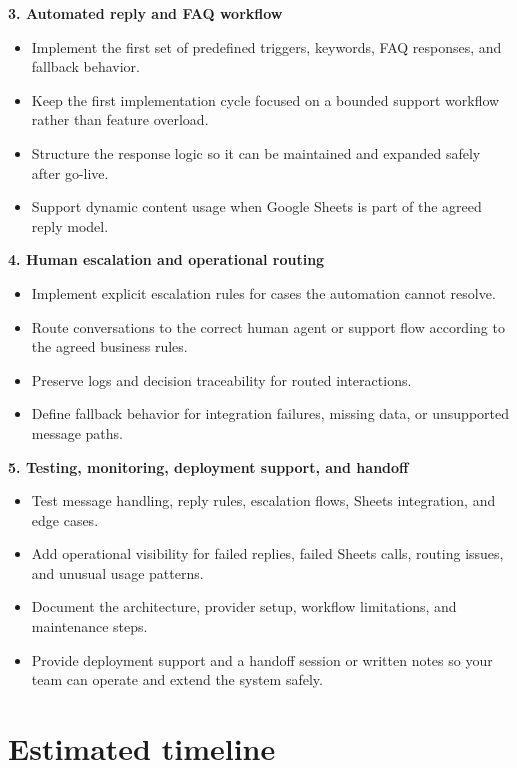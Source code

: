 \documentclass[11pt,a4paper]{article}
\begin{document}
\textbf{3. Automated reply and FAQ workflow}\par

\begin{itemize}
\item Implement the first set of predefined triggers, keywords, FAQ responses, and fallback behavior.
\item Keep the first implementation cycle focused on a bounded support workflow rather than feature overload.
\item Structure the response logic so it can be maintained and expanded safely after go-live.
\item Support dynamic content usage when Google Sheets is part of the agreed reply model.
\end{itemize}

\textbf{4. Human escalation and operational routing}\par

\begin{itemize}
\item Implement explicit escalation rules for cases the automation cannot resolve.
\item Route conversations to the correct human agent or support flow according to the agreed business rules.
\item Preserve logs and decision traceability for routed interactions.
\item Define fallback behavior for integration failures, missing data, or unsupported message paths.
\end{itemize}

\textbf{5. Testing, monitoring, deployment support, and handoff}\par

\begin{itemize}
\item Test message handling, reply rules, escalation flows, Sheets integration, and edge cases.
\item Add operational visibility for failed replies, failed Sheets calls, routing issues, and unusual usage patterns.
\item Document the architecture, provider setup, workflow limitations, and maintenance steps.
\item Provide deployment support and a handoff session or written notes so your team can operate and extend the system safely.
\end{itemize}

\section*{Estimated timeline}
\end{document}
